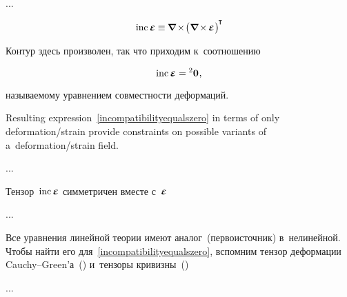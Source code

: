 \begin{otherlanguage}{russian}
...

\begin{equation*}
\operatorname{inc} \infinitesimaldeformation \hspace{-0.05ex}
\equiv
\hspace{-0.07ex} \boldnabla \hspace{-0.2ex} \times \hspace{-0.36ex} \bigl( \hspace{.06ex} \boldnabla \hspace{-0.2ex} \times \hspace{-0.16ex} \infinitesimaldeformation \hspace{.1ex} \bigr)^{\hspace{-0.2ex}\T}
\end{equation*}

Контур здесь произволен, так что приходим к~соотношению

\nopagebreak\vspace{-0.25em}\begin{equation}\label{incompatibilityequalszero}
\operatorname{inc} \infinitesimaldeformation = \hspace{-0.07ex} {^2\bm{0}}
\hspace{.1ex} ,
\end{equation}

\vspace{-0.33em}\noindent
называемому уравнением совместности деформаций.

{\small
Resulting expression~\eqref{incompatibilityequalszero} in terms of only deformation/strain provide constraints on possible variants of a~deformation/strain field.
\par}

...

Тензор~${\operatorname{inc} \infinitesimaldeformation}$ симметричен вместе с~${\infinitesimaldeformation}$

...

Все уравнения линейной теории имеют аналог~(перво\-источ\-ник) в~нелинейной.
Чтобы найти его для~\eqref{incompatibilityequalszero}, вспомним тензор деформации Cauchy\hbox{--}Green’а~() и~тензоры кривизны~()

...



\end{otherlanguage}


